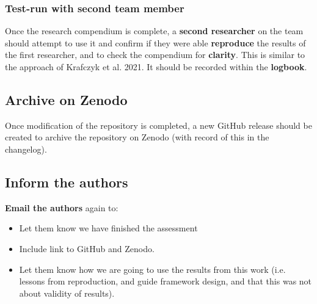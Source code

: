 \newpage
\subsubsection{Test-run with second team member}

Once the research compendium is complete, a \textbf{second researcher} on the team should attempt to use it and confirm if they were able \textbf{reproduce} the results of the first researcher, and to check the compendium for \textbf{clarity}. This is similar to the approach of Krafczyk et al. 2021.\autocite{krafczyk_learning_2021} It should be recorded within the \textbf{logbook}.

\vspace{0.5cm}
\subsection{Archive on Zenodo}

Once modification of the repository is completed, a new GitHub release should be created to archive the repository on Zenodo (with record of this in the changelog).

\vspace{0.5cm}
\subsection{Inform the authors}

\textbf{Email the authors} again to:
\begin{itemize}
    \item Let them know we have finished the assessment
    \item Include link to GitHub and Zenodo.
    \item Let them know how we are going to use the results from this work (i.e. lessons from reproduction, and guide framework design, and that this was not about validity of results).
\end{itemize}